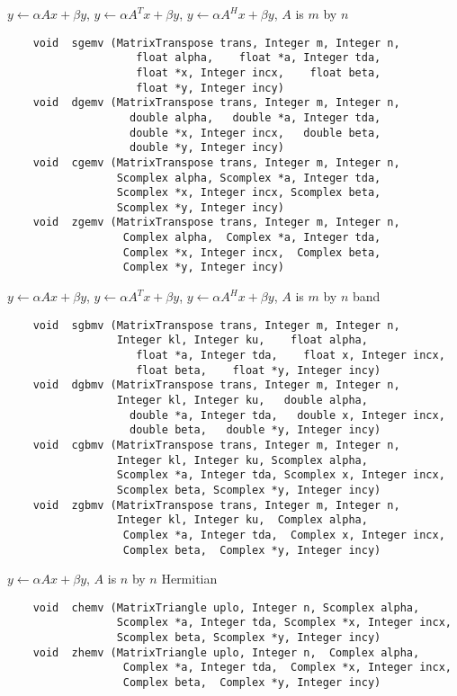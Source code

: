 \vspace{.5cm}
\noindent
$y \leftarrow \alpha Ax + \beta y$,
$y \leftarrow \alpha A^T x + \beta y$,
$y \leftarrow \alpha A^H x + \beta y$,
$A$ is $m$ by $n$
\footnotesize
\begin{verbatim}
    void  sgemv (MatrixTranspose trans, Integer m, Integer n,
                    float alpha,    float *a, Integer tda,
                    float *x, Integer incx,    float beta,
                    float *y, Integer incy)
    void  dgemv (MatrixTranspose trans, Integer m, Integer n,
                   double alpha,   double *a, Integer tda,
                   double *x, Integer incx,   double beta,
                   double *y, Integer incy)
    void  cgemv (MatrixTranspose trans, Integer m, Integer n,
                 Scomplex alpha, Scomplex *a, Integer tda,
                 Scomplex *x, Integer incx, Scomplex beta,
                 Scomplex *y, Integer incy)
    void  zgemv (MatrixTranspose trans, Integer m, Integer n,
                  Complex alpha,  Complex *a, Integer tda,
                  Complex *x, Integer incx,  Complex beta,
                  Complex *y, Integer incy) 
\end{verbatim}
\normalsize
$y \leftarrow \alpha Ax + \beta y$,
$y \leftarrow \alpha A^T x + \beta y$,
$y \leftarrow \alpha A^H x + \beta y$, $A$ is $m$ by $n$ band
\footnotesize
\begin{verbatim}
    void  sgbmv (MatrixTranspose trans, Integer m, Integer n,
                 Integer kl, Integer ku,    float alpha,
                    float *a, Integer tda,    float x, Integer incx,
                    float beta,    float *y, Integer incy)
    void  dgbmv (MatrixTranspose trans, Integer m, Integer n,
                 Integer kl, Integer ku,   double alpha,
                   double *a, Integer tda,   double x, Integer incx,
                   double beta,   double *y, Integer incy)
    void  cgbmv (MatrixTranspose trans, Integer m, Integer n,
                 Integer kl, Integer ku, Scomplex alpha,
                 Scomplex *a, Integer tda, Scomplex x, Integer incx,
                 Scomplex beta, Scomplex *y, Integer incy)
    void  zgbmv (MatrixTranspose trans, Integer m, Integer n,
                 Integer kl, Integer ku,  Complex alpha,
                  Complex *a, Integer tda,  Complex x, Integer incx,
                  Complex beta,  Complex *y, Integer incy)
\end{verbatim}
\normalsize
$y \leftarrow \alpha Ax + \beta y$, $A$ is $n$ by $n$ Hermitian
\footnotesize
\begin{verbatim}
    void  chemv (MatrixTriangle uplo, Integer n, Scomplex alpha,
                 Scomplex *a, Integer tda, Scomplex *x, Integer incx,
                 Scomplex beta, Scomplex *y, Integer incy)
    void  zhemv (MatrixTriangle uplo, Integer n,  Complex alpha,
                  Complex *a, Integer tda,  Complex *x, Integer incx,
                  Complex beta,  Complex *y, Integer incy)
\end{verbatim}
